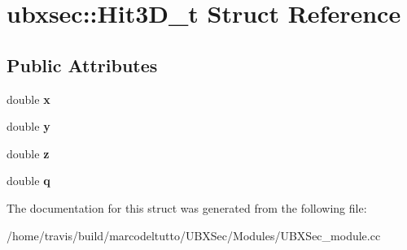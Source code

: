 \hypertarget{structubxsec_1_1Hit3D__t}{\section{ubxsec\-:\-:Hit3\-D\-\_\-t Struct Reference}
\label{structubxsec_1_1Hit3D__t}
}
\subsection*{Public Attributes}
\begin{DoxyCompactItemize}
\item 
\hypertarget{structubxsec_1_1Hit3D__t_ab4929fe0026546ff06fdf001ecfa5b33}{double {\bfseries x}}\label{structubxsec_1_1Hit3D__t_ab4929fe0026546ff06fdf001ecfa5b33}

\item 
\hypertarget{structubxsec_1_1Hit3D__t_ab5462982ffba0961cd4aa3399efac368}{double {\bfseries y}}\label{structubxsec_1_1Hit3D__t_ab5462982ffba0961cd4aa3399efac368}

\item 
\hypertarget{structubxsec_1_1Hit3D__t_a109099e70c1e956e35cf6d4ecab9ef02}{double {\bfseries z}}\label{structubxsec_1_1Hit3D__t_a109099e70c1e956e35cf6d4ecab9ef02}

\item 
\hypertarget{structubxsec_1_1Hit3D__t_a205dc1ee3dba776b70d58809fdc481aa}{double {\bfseries q}}\label{structubxsec_1_1Hit3D__t_a205dc1ee3dba776b70d58809fdc481aa}

\end{DoxyCompactItemize}


The documentation for this struct was generated from the following file\-:\begin{DoxyCompactItemize}
\item 
/home/travis/build/marcodeltutto/\-U\-B\-X\-Sec/\-Modules/U\-B\-X\-Sec\-\_\-module.\-cc\end{DoxyCompactItemize}

